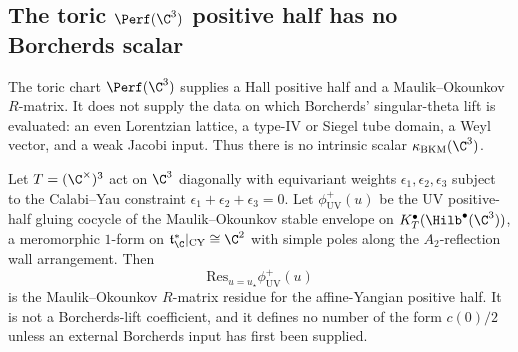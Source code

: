 \subsection{The toric
\texorpdfstring{$\Perf(\C^3)$}{Perf(C3)} positive half has no Borcherds scalar}
\label{subsec:thy-grd-mo-c3-terminal}

\providecommand{\phiUV}{\phi^{+}_{\mathrm{UV}}}
The toric chart \(\Perf(\C^3)\) supplies a Hall positive half and a
Maulik--Okounkov \(R\)-matrix. It does not supply the data on which
Borcherds' singular-theta lift is evaluated: an even Lorentzian lattice,
a type-IV or Siegel tube domain, a Weyl vector, and a weak Jacobi input.
Thus there is no intrinsic scalar \(\kappa_{\mathrm{BKM}}(\C^3)\).

\begin{theorem}
\label{thm:bl-mo-c3-vanishing}
Let $T = (\C^\times)^3$ act on $\C^3$ diagonally with equivariant weights
$\epsilon_1, \epsilon_2, \epsilon_3$ subject to the Calabi--Yau constraint
$\epsilon_1 + \epsilon_2 + \epsilon_3 = 0$. Let
$\phiUV(u)$ be the UV positive-half gluing cocycle of the
Maulik--Okounkov stable envelope on $K^{\bullet}_T(\Hilb^\bullet(\C^3))$,
a meromorphic $1$-form on $\mathfrak t^*_\C|_{\mathrm{CY}} \cong \C^2$
with simple poles along the $A_2$-reflection wall arrangement. Then
\[
 \mathrm{Res}_{u=u_\star}\phiUV(u)
\]
is the Maulik--Okounkov \(R\)-matrix residue for the affine-Yangian
positive half. It is not a Borcherds-lift coefficient, and it defines no
number of the form \(c(0)/2\) unless an external Borcherds input has
first been supplied.
\end{theorem}

